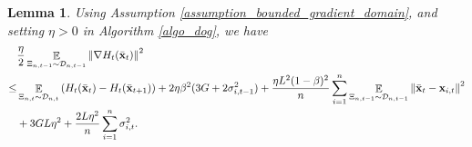 \documentclass{article}
\newtheorem{Lemma}{\bf{Lemma}}
\begin{document}
\begin{Lemma}
\label{lemma_gradient_norm_bound}
Using Assumption \ref{assumption_bounded_gradient_domain}, and setting $\eta>0$ in Algorithm \ref{algo_dog}, we have 
\begin{align}
\nonumber
& \frac{\eta}{2}\mathop{\mathbb{E}}_{ \Xi_{n,t-1} \sim \mathcal{D}_{n,t-1} }\left\lVert\nabla H_t(\bar{{\bf x}}_t)\right\rVert^2  \\ \nonumber 
\le & \mathop{\mathbb{E}}_{ \Xi_{n,t} \sim \mathcal{D}_{n,t} } \left( H_t(\bar{{\bf x}}_t) - H_t(\bar{{\bf x}}_{t+1}) \right) + 2\eta\beta^2(3G + 2\sigma_{i,t-1}^2) +  \frac{\eta L^2(1-\beta)^2}{n}\sum_{i=1}^n\mathop{\mathbb{E}}_{ \Xi_{n,t-1} \sim \mathcal{D}_{n,t-1} }\left\lVert\bar{{\bf x}}_t - {\bf x}_{i,t} \right\rVert^2 \\ \label{equa_lemma_gradient_norm_bound}  
& + 3GL\eta^2  + \frac{2L\eta^2}{n}\sum_{i=1}^n \sigma_{i,t}^2.
\end{align}
\end{Lemma}
\end{document}
